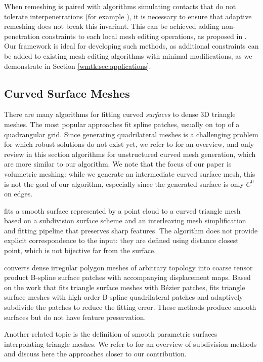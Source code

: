 When remeshing is paired with algorithms simulating contacts that do not tolerate interpenetrations (for example \cite{Li2020IPC}), it is necessary to ensure that adaptive remeshing does not break this invariant. This can be achieved adding non-penetration constraints to each local mesh editing operations, as proposed in \cite{Brochu:2012}. Our framework is ideal for developing such methods, as additional constraints can be added to existing mesh editing algorithms with minimal modifications, as we demonstrate in Section \ref{wmtk:sec:applications}.


\subsection{Curved Surface Meshes}
There are many algorithms for fitting curved \emph{surfaces} to dense 3D triangle meshes. The most popular approaches fit spline patches, usually on top of a quadrangular grid. Since generating quadrilateral meshes is a challenging problem for which robust solutions do not exist yet, we refer to \cite{QUADSTAR2012} for an overview, and only review in this section algorithms for unstructured curve{d} mesh generation, which are more similar to our algorithm. We note that the focus of our paper is volumetric meshing: while we generate an intermediate curved surface mesh, this is not the goal of our algorithm, especially since the generated surface is only $C^0$ on edges.

\cite{hoppe1994piecewise} fits a smooth surface represented by a point cloud to a curved triangle mesh based on a subdivision surface scheme and an interleaving mesh simplification and fitting pipeline that preserves sharp features. 
The algorithm does not provide explicit correspondence to the input: they are defined using distance closest point, which is not bijective far from the surface. 

\cite{krishnamurthy1996fitting} converts dense irregular polygon meshes of arbitrary topology into coarse tensor product B-spline surface patches with accompanying displacement maps. Based on the work \cite{LIN2007adap} that fits triangle surface meshes with B\'ezier patches, \cite{Zhang2011multi} fits triangle surface meshes with high-order B-spline quadrilateral patches and adaptively subdivide the patches to reduce the fitting error. These methods produce smooth surfaces but do not have feature preservation.

Another related topic is the definition of smooth parametric surfaces interpolating triangle meshes. We refer to \cite{zorin2000subdivision} for an overview of subdivision methods and discuss here the approaches closer to our contribution.

